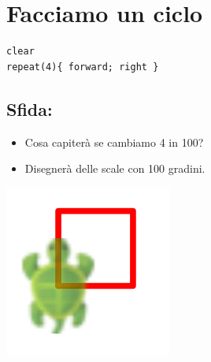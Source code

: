 \chapter{Facciamo un ciclo}
\begin{multicols}{2}

\begin{lstlisting}[basicstyle={\ttfamily\fontsize{30}{36}\selectfont},numbers=none]
clear
repeat(4){ forward; right }
\end{lstlisting}
        
\section*{\color{BrickRed}Sfida:}


\begin{itemize}

\item {Cosa capiterà se cambiamo 4 in 100?}
\item {Disegnerà delle scale con 100 gradini.}

\end{itemize}



\columnbreak

\begin{center}
\includegraphics{../img/square.png}
\end{center}

\end{multicols}

